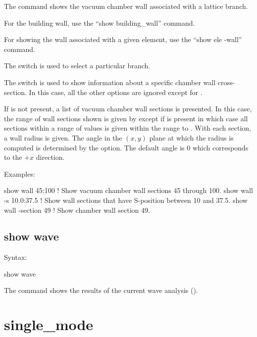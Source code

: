 {{{{{{{{{{{The  command shows the vacuum chamber wall associated with a lattice branch.

For the building wall, use the ``show building_wall'' command.

For showing the wall associated with a given element, use the ``show ele -wall'' command.

The  switch is used to select a particular branch.

The  switch is used to show information about a specific chamber wall cross-section. In
this case, all the other options are ignored except for .

If  is not present, a list of vacuum chamber wall sections is presented. In this case,
the range of wall sections shown is given by  except if  is present in which
case all sections within a range of  values is given within the range  to
. With each section, a wall radius is given. The angle in the $(x,y)$ plane at which the
radius is computed is determined by the  option. The default angle is 0 which corresponds
to the $+x$ direction.

Examples:
\begin{example}
  show wall 45:100       ! Show vacuum chamber wall sections 45 through 100.
  show wall -s 10.0:37.5 ! Show wall sections that have S-position between 10 and 37.5.
  show wall -section 49  ! Show chamber wall section 49.
\end{example}


\subsection{show wave}
\label{s:show.wave}

Syntax:
\begin{example}
  show wave
\end{example}

The  command shows the results of the current wave analysis ().


\section{single_mode}
\label{s:sing}

}}}}}}}}}}}
